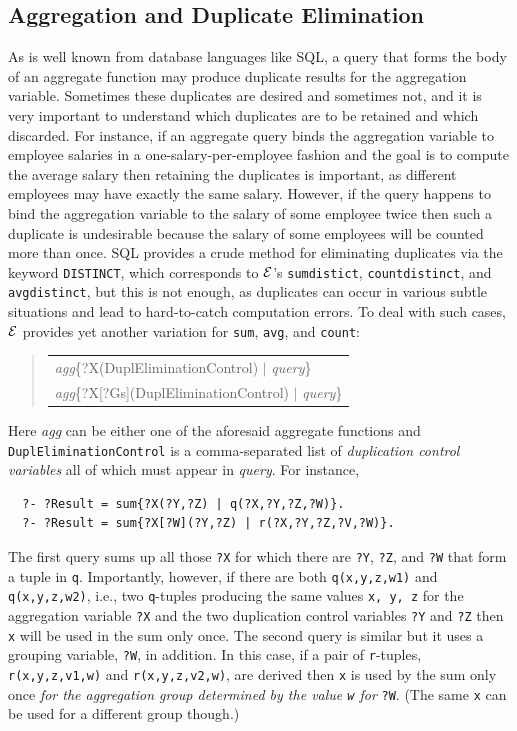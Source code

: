 \documentclass[11pt]{article}
\newcommand{\ERGO}{\mbox{\ensuremath{\cal{E}}\smaller{{\sc{RGO}}}}\xspace}
\newcommand{\FLSYSTEM}{\ERGO}
\newenvironment{qrules}{\begin{quote}\tt\begin{tabular}[t]{l}}%
{\end{tabular}\end{quote}}
\begin{document}
\subsection {Aggregation and Duplicate Elimination}\label{sec-dupl-control}

As is well known from database languages like SQL, a query
that forms the body of an aggregate function
may produce duplicate results for the aggregation variable.
Sometimes these duplicates are desired and sometimes not, and it is very
important to understand which duplicates are to be retained and which
discarded. For instance, if an aggregate query binds the aggregation
variable to employee salaries in a one-salary-per-employee fashion and the
goal is to compute the average salary then
retaining the duplicates is important, as different employees may have
exactly the same salary. However, if the query happens to bind the
aggregation variable to the salary of some employee twice then such a
duplicate is undesirable because the salary of some employees will be
counted more than once.  SQL provides a crude method for eliminating
duplicates via the keyword \texttt{DISTINCT}, which corresponds to
\FLSYSTEM's \texttt{sumdistict}, \texttt{countdistinct}, and
\texttt{avgdistinct}, but this is not enough, as duplicates can occur in
various subtle situations and lead to hard-to-catch computation errors.    
To deal with such cases, \FLSYSTEM provides yet another variation for
\texttt{sum}, \texttt{avg}, and \texttt{count}:
\begin{qrules}
\textnormal{\emph{agg}}\{?X(DuplEliminationControl) $|$ {\it query}\}\\
\textnormal{\emph{agg}}\{?X[?Gs](DuplEliminationControl) $|$ {\it query}\}
\end{qrules}
Here \emph{agg} can be either one of the aforesaid aggregate functions and
\texttt{DuplEliminationControl} is a comma-separated list of \emph{duplication
control variables}   all
of which must appear in \emph{query}. For instance,
\begin{verbatim}
  ?- ?Result = sum{?X(?Y,?Z) | q(?X,?Y,?Z,?W)}.
  ?- ?Result = sum{?X[?W](?Y,?Z) | r(?X,?Y,?Z,?V,?W)}.
\end{verbatim}
The first query sums up all those \texttt{?X} for which there are
\texttt{?Y}, \texttt{?Z}, and \texttt{?W} that form a tuple in \texttt{q}.
Importantly, however, if there are both \texttt{q(x,y,z,w1)} and
\texttt{q(x,y,z,w2)}, i.e., two \texttt{q}-tuples producing the same values
\texttt{x, y, z} for the aggregation variable \texttt{?X} and the two
duplication control variables \texttt{?Y} and \texttt{?Z} then \texttt{x}
will be used in the sum only once.    
The second query is similar but it uses a grouping variable, \texttt{?W},
in addition. 
In this case, if a pair of \texttt{r}-tuples, \texttt{r(x,y,z,v1,w)} and
\texttt{r(x,y,z,v2,w)}, are derived then \texttt{x} is used by the sum only
once \emph{for the aggregation group determined by the value \texttt{w}
  for}
\texttt{?W}.  (The same \texttt{x} can be used for a different group
though.)  
\end{document}

